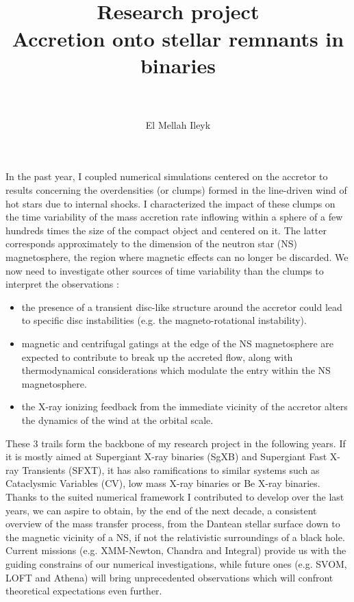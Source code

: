 \documentclass[a4paper,12pt,onecolumn]{article}
\title{	
\vspace*{-2cm}
\normalfont \tiny 
\horrule{0.5pt} \\[0.4cm] %
\huge Research project \\ \vspace*{0.5cm} \textbf{Accretion onto stellar remnants in binaries} \\ %
\horrule{2pt} \\[0.5cm] %
}
\author{El Mellah Ileyk} %
\date{\tiny }%
\makeatletter
\newcommand{\sgx}{SgXB\xspace}
\newcommand*{\ns}{NS\@\xspace}
\newcommand*{\eg}{e.g.\@\xspace}
\makeatother
\begin{document}


\begin{adjustwidth}{-0.4cm}{-0.4cm}
\maketitle
\end{adjustwidth} 

\thispagestyle{empty}

In the past year, I coupled numerical simulations centered on the accretor to results concerning the overdensities (or clumps) formed in the line-driven wind of hot stars due to internal shocks. I characterized the impact of these clumps on the time variability of the mass accretion rate inflowing within a sphere of a few hundreds times the size of the compact object and centered on it. The latter corresponds approximately to the dimension of the neutron star (\ns) magnetosphere, the region where magnetic effects can no longer be discarded. We now need to investigate other sources of time variability than the clumps to interpret the observations :
\begin{itemize}
\item the presence of a transient disc-like structure around the accretor could lead to specific disc instabilities (\eg the magneto-rotational instability).
\item magnetic and centrifugal gatings at the edge of the NS magnetosphere are expected to contribute to break up the accreted flow, along with thermodynamical considerations which modulate the entry within the NS magnetosphere.
\item the X-ray ionizing feedback from the immediate vicinity of the accretor alters the dynamics of the wind at the orbital scale.
\end{itemize}
These 3 trails form the backbone of my research project in the following years. If it is mostly aimed at Supergiant X-ray binaries (\sgx) and Supergiant Fast X-ray Transients (SFXT), it has also ramifications to similar systems such as Cataclysmic Variables (CV), low mass X-ray binaries or Be X-ray binaries. Thanks to the suited numerical framework I contributed to develop over the last years, we can aspire to obtain, by the end of the next decade, a consistent overview of the mass transfer process, from the Dantean stellar surface down to the magnetic vicinity of a NS, if not the relativistic surroundings of a black hole. Current missions (\eg XMM-Newton, Chandra and Integral) provide us with the guiding constrains of our numerical investigations, while future ones (\eg SVOM, LOFT and Athena) will bring unprecedented observations which will confront theoretical expectations even further.
\end{document}
